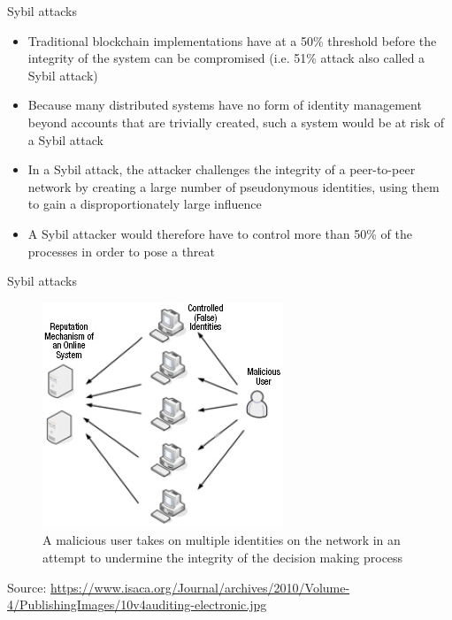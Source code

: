 \documentclass[10pt]{beamer}
\begin{document}
\begin{frame}{Sybil attacks}
	\begin{itemize}
		\item Traditional blockchain implementations have at a 50\% threshold before the integrity of the system can be compromised (i.e. 51\% attack also called a Sybil attack)
		\item  Because many distributed systems have no form of identity management beyond accounts that are trivially created, such a system would be at risk of a Sybil attack
		\item In a Sybil attack, the attacker challenges the integrity of a peer-to-peer network by creating a large number of pseudonymous identities, using them to gain a disproportionately large influence
		\item A Sybil attacker would therefore have to control more than 50\% of the processes in order to pose a threat
	\end{itemize}
\end{frame}


\begin{frame}{Sybil attacks}
	\begin{figure}[]
		\centering
		\includegraphics  [scale=0.5]{Images/sybil}
		\caption{A malicious user takes on multiple identities on the network in an attempt to undermine the integrity of the decision making process}
	\end{figure}
	\begin{tiny}
		Source: \href{https://www.isaca.org/Journal/archives/2010/Volume-4/Pages/JOnline-Auditing-Electronic-Auction-Systems.aspx}{https://www.isaca.org/Journal/archives/2010/Volume-4/PublishingImages/10v4auditing-electronic.jpg}
	\end{tiny}
\end{frame}
\end{document}
